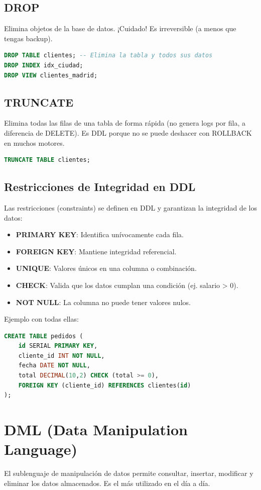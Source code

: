 \documentclass[12pt,a4paper,openany,oneside]{book}
\begin{document}
\subsection{DROP}
Elimina objetos de la base de datos. ¡Cuidado! Es irreversible (a menos que tengas backup).
\begin{lstlisting}[language=SQL]
DROP TABLE clientes; -- Elimina la tabla y todos sus datos
DROP INDEX idx_ciudad;
DROP VIEW clientes_madrid;
\end{lstlisting}

\subsection{TRUNCATE}
Elimina todas las filas de una tabla de forma rápida (no genera logs por fila, a diferencia de DELETE). Es DDL porque no se puede deshacer con ROLLBACK en muchos motores.
\begin{lstlisting}[language=SQL]
TRUNCATE TABLE clientes;
\end{lstlisting}

\subsection{Restricciones de Integridad en DDL}
Las restricciones (constraints) se definen en DDL y garantizan la integridad de los datos:
\begin{itemize}
    \item \textbf{PRIMARY KEY}: Identifica unívocamente cada fila.
    \item \textbf{FOREIGN KEY}: Mantiene integridad referencial.
    \item \textbf{UNIQUE}: Valores únicos en una columna o combinación.
    \item \textbf{CHECK}: Valida que los datos cumplan una condición (ej. salario > 0).
    \item \textbf{NOT NULL}: La columna no puede tener valores nulos.
\end{itemize}
Ejemplo con todas ellas:
\begin{lstlisting}[language=SQL]
CREATE TABLE pedidos (
    id SERIAL PRIMARY KEY,
    cliente_id INT NOT NULL,
    fecha DATE NOT NULL,
    total DECIMAL(10,2) CHECK (total >= 0),
    FOREIGN KEY (cliente_id) REFERENCES clientes(id)
);
\end{lstlisting}

\section{DML (Data Manipulation Language)}
El sublenguaje de manipulación de datos permite consultar, insertar, modificar y eliminar los datos almacenados. Es el más utilizado en el día a día.
\end{document}
